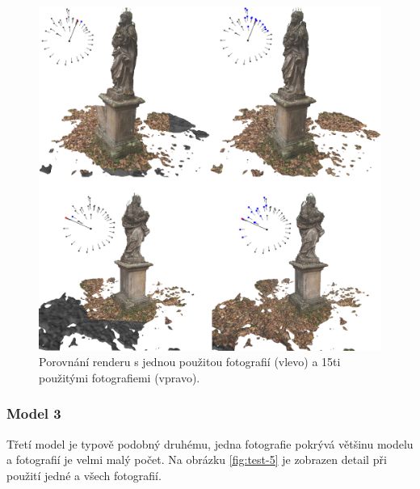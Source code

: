 \documentclass[11pt,twoside,a4paper]{book}
\begin{document}
\begin{figure}[h!]
\begin{center}
\includegraphics[width=\textwidth]{figures/test-4}
\caption{Porovnání renderu s jednou použitou fotografií (vlevo) a 15ti použitými fotografiemi (vpravo).}
\label{fig:test-4}
\end{center}
\end{figure}

\subsubsection*{Model 3}

Třetí model je typově podobný druhému, jedna fotografie pokrývá většinu modelu a fotografií je velmi malý počet. Na obrázku \ref{fig:test-5} je zobrazen detail při použití jedné a všech fotografií.
\end{document}
